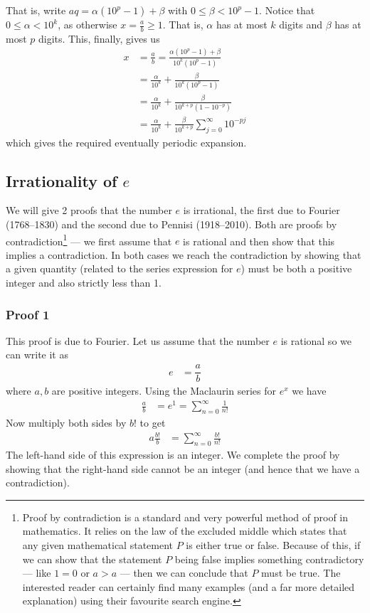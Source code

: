 That is, write $aq =\alpha (10^p-1) + \beta$ with
$0\leq \beta < 10^p-1$. Notice that $0\leq \alpha < 10^k$, as
otherwise $x=\frac{a}{b} \geq 1$. That is, $\alpha$ has at most $k$ digits and $\beta$ has at most $p$ digits. This, finally, gives us
\begin{align*}
  x &= \frac{a}{b} = \frac{\alpha(10^p-1) + \beta}{10^k (10^p-1)}\\
  &= \frac{\alpha}{10^k} + \frac{\beta}{10^k(10^p-1)} \\
  &= \frac{\alpha}{10^k} + \frac{\beta}{10^{k+p}(1-10^{-p})}\\
  &= \frac{\alpha}{10^k} + \frac{\beta}{10^{k+p}}\sum_{j=0}^\infty 10^{-pj}
\end{align*}
which gives the required eventually periodic expansion.


\subsection*{Irrationality of $e$}
We will give 2 proofs that the number $e$ is irrational, the first
due to Fourier (1768--1830) and the second due to
Pennisi (1918--2010). Both are proofs by contradiction\footnote{
Proof by contradiction is a standard and very powerful method of proof in
mathematics. It relies on the law of the excluded middle which states that any
given mathematical statement $P$ is either true or false. Because of this, if
we can show that the statement $P$ being false implies something contradictory
--- like $1=0$ or $a>a$ --- then we can conclude that $P$ must be true. The
interested reader can certainly find many examples (and a far more detailed
explanation) using their favourite search engine.} --- we first assume that $e$ is rational and then
show that this implies a contradiction. In both cases we reach the
contradiction by showing that a given quantity (related to the series
expression for $e$) must be both a positive integer and also
strictly less than 1.
\subsubsection*{Proof 1}
This proof is due to Fourier. Let us assume that the number $e$ is rational
so we can write it as
\begin{align*}
e &= \dfrac{a}{b}
\end{align*}
where $a,b$ are positive integers. Using the Maclaurin series for $e^x$ we have
\begin{align*}
\frac{a}{b} &= e^1 = \sum_{n=0}^\infty \frac{1}{n!}
\end{align*}
Now multiply both sides by $b!$ to get
\begin{align*}
a \frac{b!}{b} &= \sum_{n=0}^\infty \frac{b!}{n!}
\end{align*}
The left-hand side of this expression is an integer. We complete the proof by showing that the
right-hand side cannot be an integer (and hence that we have a contradiction).

